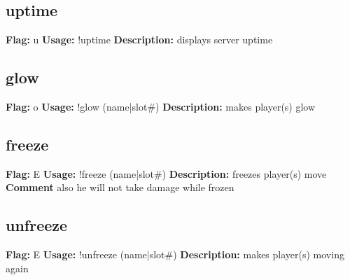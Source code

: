 \subsection{uptime}
\textbf{Flag:} \hfill u \linebreak\textbf{Usage:} \hfill !uptime  \linebreak
\textbf{Description:} \hfill displays server uptime

\subsection{glow}
\textbf{Flag:} \hfill o \linebreak\textbf{Usage:} \hfill !glow (name|slot\#) \linebreak
\textbf{Description:} \hfill makes player(s) glow

\subsection{freeze}
\textbf{Flag:} \hfill E \linebreak\textbf{Usage:} \hfill !freeze (name|slot\#) \linebreak
\textbf{Description:} \hfill freezes player(s) move
\linebreak
\textbf{Comment} \hfill also he will not take damage while frozen

\subsection{unfreeze}
\textbf{Flag:} \hfill E \linebreak\textbf{Usage:} \hfill !unfreeze (name|slot\#) \linebreak
\textbf{Description:} \hfill makes player(s) moving again


